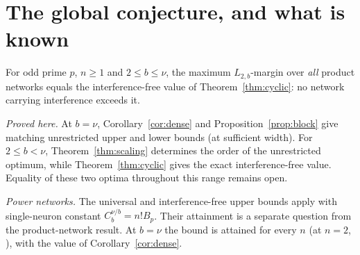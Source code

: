 \section{The global conjecture, and what is known}\label{app:conjecture}

\begin{conjecture}
For odd prime $p$, $n\ge1$ and $2\le b\le\nu$, the maximum $L_{2,b}$-margin over \emph{all} product networks equals the interference-free value of Theorem~\ref{thm:cyclic}: no network carrying interference exceeds it.
\end{conjecture}

\emph{Proved here.} At $b=\nu$, Corollary~\ref{cor:dense} and Proposition~\ref{prop:block} give matching unrestricted upper and lower bounds (at sufficient width). For $2\le b<\nu$, Theorem~\ref{thm:scaling} determines the order of the unrestricted optimum, while Theorem~\ref{thm:cyclic} gives the exact interference-free value. Equality of these two optima throughout this range remains open.

\emph{Power networks.} The universal and interference-free upper bounds apply with single-neuron constant $C_b^{\nu/b}=n!B_p$. Their attainment is a separate question from the product-network result. At $b=\nu$ the bound is attained for every $n$ \citep[Thm.~4.1]{li2025nsum} (at $n=2$, \citealp[Thm.~7]{morwani2024feature}), with the value of Corollary~\ref{cor:dense}.

% 
% 
% 

